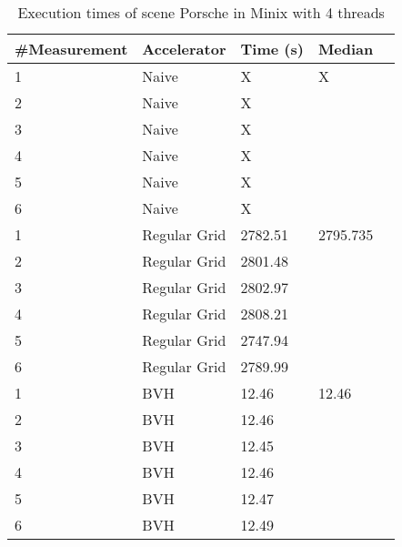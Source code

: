 \begin{table}[H]
	\small
	\begin{tabular}{|l|l|l|l|l|}
		\hline
		\#Measurement & Accelerator & Time (s) & Median \\ \hline
		1 & Naive & X & X \\ \hline
		2 & Naive & X & \\ \hline
		3 & Naive & X & \\ \hline
		4 & Naive & X & \\ \hline
		5 & Naive & X & \\ \hline
		6 & Naive & X & \\ \hline
		1 & Regular Grid & 2782.51 & 2795.735 \\ \hline
		2 & Regular Grid & 2801.48 & \\ \hline
		3 & Regular Grid & 2802.97 & \\ \hline
		4 & Regular Grid & 2808.21 & \\ \hline
		5 & Regular Grid & 2747.94 & \\ \hline
		6 & Regular Grid & 2789.99 & \\ \hline
		1 & BVH & 12.46 & 12.46 \\ \hline
		2 & BVH & 12.46 & \\ \hline
		3 & BVH & 12.45 & \\ \hline
		4 & BVH & 12.46 & \\ \hline
		5 & BVH & 12.47 & \\ \hline
		6 & BVH & 12.49 & \\ \hline
	\end{tabular}
	\label{Time}
	\caption{Execution times of scene Porsche in Minix with 4 threads}
\end{table}

